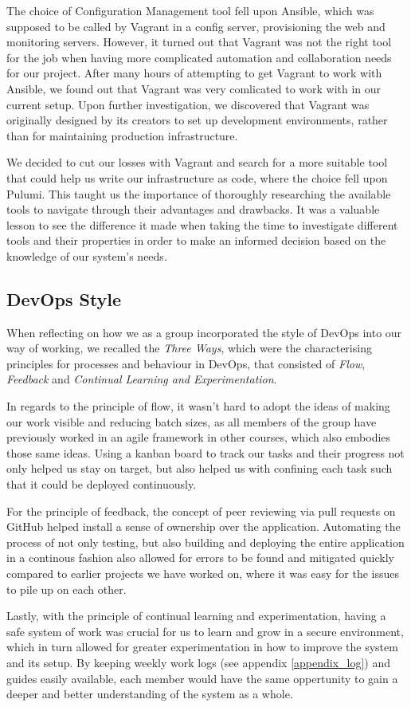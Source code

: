 The choice of Configuration Management tool fell upon Ansible, which was supposed to be called by Vagrant in a config server, provisioning the web and monitoring servers.
However, it turned out that Vagrant was not the right tool for the job when having more complicated automation and collaboration needs for our project.
After many hours of attempting to get Vagrant to work with Ansible, we found out that Vagrant was very comlicated to work with in our current setup\cite{issue178-vagrant-ansible}. Upon further investigation, we discovered that Vagrant was originally designed by its creators to set up development environments, rather than for maintaining production infrastructure\cite{vagrant_vs_terraform}.

We decided to cut our losses with Vagrant and search for a more suitable tool that could help us write our infrastructure as code, where the choice fell upon Pulumi.
This taught us the importance of thoroughly researching the available tools to navigate through their advantages and drawbacks.
It was a valuable lesson to see the difference it made when taking the time to investigate different tools and their properties in order to make an informed decision based on the knowledge of our system's needs.

\subsection{DevOps Style}
When reflecting on how we as a group incorporated the style of DevOps into our way of working, we recalled the \textit{Three Ways}, which were the characterising principles for processes and behaviour in DevOps, that consisted of \textit{Flow}, \textit{Feedback} and \textit{Continual Learning and Experimentation}\cite{devopshandbook}.

In regards to the principle of flow, it wasn't hard to adopt the ideas of making our work visible and reducing batch sizes, as all members of the group have previously worked in an agile framework in other courses, which also embodies those same ideas. Using a kanban board to track our tasks and their progress not only helped us stay on target, but also helped us with confining each task such that it could be deployed continuously\cite{devopshandbook}.

For the principle of feedback, the concept of peer reviewing via pull requests on GitHub helped install a sense of ownership over the application. Automating the process of not only testing, but also building and deploying the entire application in a continous fashion also allowed for errors to be found and mitigated quickly compared to earlier projects we have worked on, where it was easy for the issues to pile up on each other.

Lastly, with the principle of continual learning and experimentation, having a safe system of work\cite{devopshandbook} was crucial for us to learn and grow in a secure environment, which in turn allowed for greater experimentation in how to improve the system and its setup. By keeping weekly work logs (see appendix \ref{appendix_log}) and guides easily available, each member would have the same oppertunity to gain a deeper and better understanding of the system as a whole.
